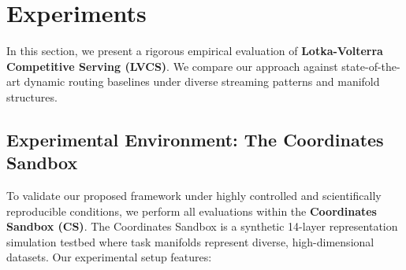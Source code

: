 \section{Experiments}
\label{sec:experiments}

In this section, we present a rigorous empirical evaluation of \textbf{Lotka-Volterra Competitive Serving (LVCS)}. We compare our approach against state-of-the-art dynamic routing baselines under diverse streaming patterns and manifold structures.

\subsection{Experimental Environment: The Coordinates Sandbox}
To validate our proposed framework under highly controlled and scientifically reproducible conditions, we perform all evaluations within the \textbf{Coordinates Sandbox (CS)}. The Coordinates Sandbox is a synthetic 14-layer representation simulation testbed where task manifolds represent diverse, high-dimensional datasets. Our experimental setup features:
